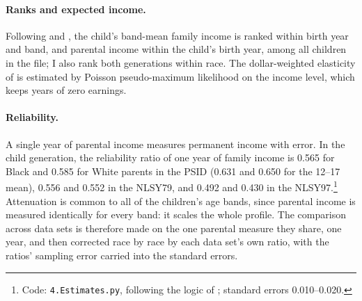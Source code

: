 \paragraph{Ranks and expected income.} Following \citet{chetty2014where} and \citet{chetty2020race}, the child's
band-mean family income is ranked within birth year and band, and parental income within the child's birth year,
among all children in the file; I also rank both generations within race. The dollar-weighted elasticity of
\citet{mitnik2020intergenerational} is estimated by Poisson pseudo-maximum likelihood on the income level, which keeps
years of zero earnings.

\paragraph{Reliability.} A single year of parental income measures permanent income with error. In the child
generation, the reliability ratio of one year of family income is 0.565 for Black and 0.585 for White parents in the
PSID (0.631 and 0.650 for the 12--17 mean), 0.556 and 0.552 in the NLSY79, and 0.492 and 0.430 in the
NLSY97.\footnote{Code: \texttt{4.Estimates.py}, following the logic of \citet{bolt2024intergenerational}; standard
errors 0.010--0.020.} Attenuation is common to all of the children's age bands, since parental income is measured
identically for every band: it scales the whole profile. The comparison across data sets is therefore made on the one
parental measure they share, one year, and then corrected race by race by each data set's own ratio, with the ratios'
sampling error carried into the standard errors.
